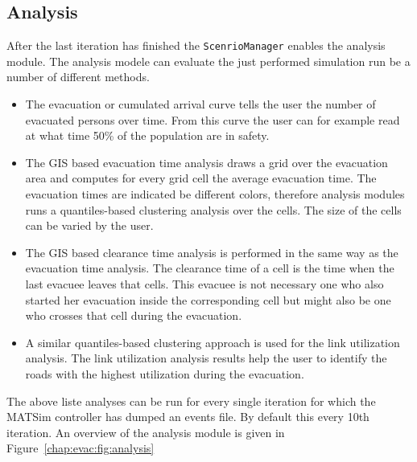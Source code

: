 \subsection{Analysis}
After the last iteration has finished the \verb+ScenrioManager+ enables the analysis module. The analysis modele can evaluate the just performed simulation run be a number of different methods. 
\begin{itemize}
\item The evacuation or cumulated arrival curve tells the user the number of evacuated persons over time. From this curve the user can for example read at what time 50\% of the population are in safety.
\item The GIS based evacuation time analysis draws a grid over the evacuation area and computes for every grid cell the average evacuation time. The evacuation times are indicated be different colors, therefore analysis modules runs a quantiles-based clustering analysis over the cells. The size of the cells can be varied  by the user.
\item The GIS based clearance time analysis is performed in the same way as the evacuation time  analysis. The clearance time of a cell is the time when the last evacuee leaves that cells. This evacuee is not necessary one who also started her evacuation inside the corresponding cell but might also be one who crosses that cell during the evacuation.
\item A similar quantiles-based clustering approach is used for the link utilization analysis. The link utilization analysis results help the user to identify the roads with the highest utilization during the evacuation.
\end{itemize}
The above liste analyses can be run for every single iteration for which the MATSim controller has dumped an events file. By default this every 10th iteration. An overview of the analysis module is given in Figure~\ref{chap:evac:fig:analysis}
